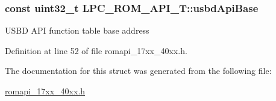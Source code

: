 \subsubsection[{\texorpdfstring{usbd\+Api\+Base}{usbdApiBase}}]{\setlength{\rightskip}{0pt plus 5cm}const uint32\+\_\+t L\+P\+C\+\_\+\+R\+O\+M\+\_\+\+A\+P\+I\+\_\+\+T\+::usbd\+Api\+Base}\hypertarget{structLPC__ROM__API__T_a94bc8146ba697eeadc992d4985971550}{}\label{structLPC__ROM__API__T_a94bc8146ba697eeadc992d4985971550}
U\+S\+BD A\+PI function table base address 

Definition at line 52 of file romapi\+\_\+17xx\+\_\+40xx.\+h.



The documentation for this struct was generated from the following file\+:\begin{DoxyCompactItemize}
\item 
\hyperlink{romapi__17xx__40xx_8h}{romapi\+\_\+17xx\+\_\+40xx.\+h}\end{DoxyCompactItemize}
